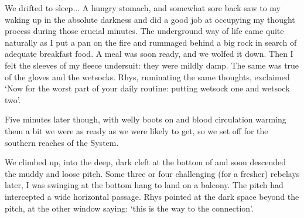 We drifted to sleep... A hungry stomach, and somewhat sore back saw to my waking up in the absolute darkness and did a good job at occupying my thought process during those crucial minutes. 
The underground way of life came quite naturally as I put a pan on the fire and rummaged behind a big rock in search of adequate breakfast food. A meal was soon ready, and we wolfed it down. Then I felt the sleeves of my fleece undersuit: they were mildly damp. The same was true of the gloves and the wetsocks. Rhys, ruminating the same thoughts, exclaimed `Now for the worst part of your daily routine: putting wetsock one and wetsock two'. 


 Five minutes later though, with welly boots on and blood circulation warming them a bit we were as ready as we were likely to get, so we set off for the southern reaches of the System. 
 


We climbed up, into the deep, dark cleft at the bottom of  and soon descended the muddy and loose  pitch. Some three or four challenging (for a fresher) rebelays later, I was swinging at the bottom hang to land on a balcony. The pitch had intercepted a wide horizontal passage. Rhys pointed at the dark space beyond the pitch, at the other window saying: `this is the way to the connection'. 


